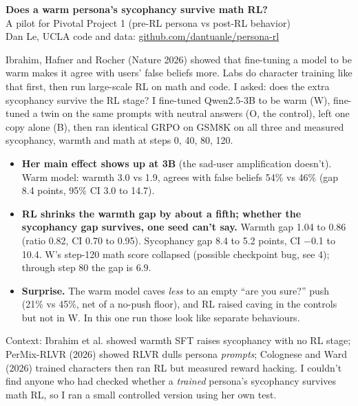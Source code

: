 \documentclass[10pt]{article}
\begin{document}
{\LARGE\bfseries Does a warm persona's sycophancy survive math RL?}\\[2pt]
{\large A pilot for Pivotal Project 1 (pre-RL persona vs post-RL behavior)}\\[3pt]
Dan Le, UCLA \quad\textbullet\quad code and data: \href{https://github.com/dantuanle/persona-rl}{github.com/dantuanle/persona-rl}

\vspace{6pt}
\noindent\colorbox{boxbg}{\begin{minipage}{\dimexpr\textwidth-2\fboxsep}
\vspace{3pt}
Ibrahim, Hafner and Rocher (Nature 2026) showed that fine-tuning a model to be warm makes it agree with users' false beliefs more. Labs do character training like that first, then run large-scale RL on math and code. I asked: does the extra sycophancy survive the RL stage? I fine-tuned Qwen2.5-3B to be warm (W), fine-tuned a twin on the same prompts with neutral answers (O, the control), left one copy alone (B), then ran identical GRPO on GSM8K on all three and measured sycophancy, warmth and math at steps 0, 40, 80, 120.
\begin{itemize}
\item \textbf{Her main effect shows up at 3B} (the sad-user amplification doesn't). Warm model: warmth 3.0 vs 1.9, agrees with false beliefs 54\% vs 46\% (gap 8.4 points, 95\% CI 3.0 to 14.7).
\item \textbf{RL shrinks the warmth gap by about a fifth; whether the sycophancy gap survives, one seed can't say.} Warmth gap 1.04 to 0.86 (ratio 0.82, CI 0.70 to 0.95). Sycophancy gap 8.4 to 5.2 points, CI $-$0.1 to 10.4. W's step-120 math score collapsed (possible checkpoint bug, see 4); through step 80 the gap is 6.9.
\item \textbf{Surprise.} The warm model caves \emph{less} to an empty ``are you sure?'' push (21\% vs 45\%, net of a no-push floor), and RL raised caving in the controls but not in W. In this one run those look like separate behaviours.
\end{itemize}
\vspace{2pt}
\end{minipage}}

{\small Context: Ibrahim et al. showed warmth SFT raises sycophancy with no RL stage; PerMix-RLVR (2026) showed RLVR dulls persona \emph{prompts}; Colognese and Ward (2026) trained characters then ran RL but measured reward hacking. I couldn't find anyone who had checked whether a \emph{trained} persona's sycophancy survives math RL, so I ran a small controlled version using her own test.}
\end{document}
